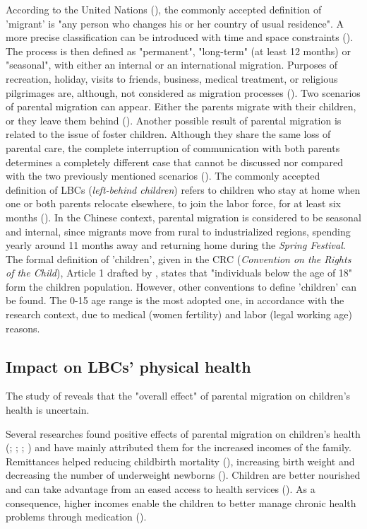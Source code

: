 According to the United Nations (\cite{united1998recommendations}), the commonly accepted definition of 'migrant' is "any person who changes his or her country of usual residence". A more precise classification can be introduced with time and space constraints (\cite{rossi2008impact}). The process is then defined as "permanent", "long-term" (at least 12 months) or "seasonal", with either an internal or an international migration. Purposes of recreation, holiday, visits to friends, business, medical treatment, or religious pilgrimages are, although, not considered as migration processes (\cite{united1998recommendations}). Two scenarios of parental migration can appear. Either the parents migrate with their children, or they leave them behind (\cite{rossi2008impact}). Another possible result of parental migration is related to the issue of foster children. Although they share the same loss of parental care, the complete interruption of communication with both parents determines a completely different case that cannot be discussed nor compared with the two previously mentioned scenarios (\cite{pilon2003foster}). The commonly accepted definition of LBCs (\textit{left-behind children}) refers to children who stay at home when one or both parents relocate elsewhere, to join the labor force, for at least six months (\cite{lu2011left}). In the Chinese context, parental migration is considered to be seasonal and internal, since migrants move from rural to industrialized regions, spending yearly around 11 months away and returning home during the \textit{Spring Festival}. The formal definition of 'children', given in the CRC (\textit{Convention on the Rights of the Child}), Article 1 drafted by \textcite{unicef1989convention}, states that "individuals below the age of 18" form the children population. However, other conventions to define 'children' can be found. The 0-15 age range is the most adopted one, in accordance with the research context, due to medical (women fertility) and labor (legal working age) reasons.

\subsection{Impact on LBCs' physical health}

The study of \textcite{guo2017effect} reveals that the "overall effect" of parental migration on children's health is uncertain. 

Several researches found positive effects of parental migration on children's health (\cite{mundial2006development}; \cite{acosta2007impact}; \cite{anton2010impact}; \cite{stillman2012impact}) and have mainly attributed them for the increased incomes of the family. Remittances helped reducing childbirth mortality (\cite{hildebrandt2005effects}), increasing birth weight and decreasing the number of underweight newborns (\cite{frank2002other}). Children are better nourished and can take advantage from an eased access to health services (\cite{nobles2006contribution}). As a consequence, higher incomes enable the children to better manage chronic health problems through medication (\cite{case2002economic}).

